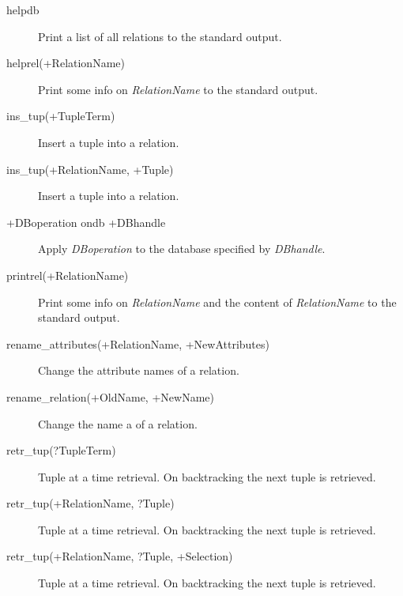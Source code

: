 \begin{description}
\item[helpdb]{Print a list of all relations to the standard output.}
\item[helprel(+RelationName)]{Print some info on {\it RelationName} to the standard output.}
\item[ins_tup(+TupleTerm)]{Insert a tuple into a relation.}
\item[ins_tup(+RelationName, +Tuple)]{Insert a tuple into a relation.}
\item[+DBoperation ondb +DBhandle]{Apply {\it DBoperation} to the database specified by {\it DBhandle}.}
\item[printrel(+RelationName)]{Print some info on {\it RelationName} and the content of {\it RelationName} to the standard output.}
\item[rename_attributes(+RelationName, +NewAttributes)]{Change the attribute names of a relation.}
\item[rename_relation(+OldName, +NewName)]{Change the name a of a relation.}
\item[retr_tup(?TupleTerm)]{Tuple at a time retrieval. On backtracking the next tuple is retrieved.}
\item[retr_tup(+RelationName, ?Tuple)]{Tuple at a time retrieval. On backtracking the next tuple is retrieved.}
\item[retr_tup(+RelationName, ?Tuple, +Selection)]{Tuple at a time retrieval. On backtracking the next tuple is retrieved.}
\end{description}

